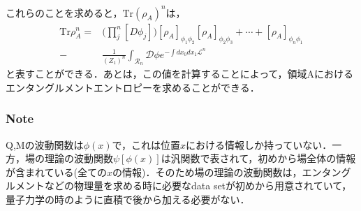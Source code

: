 これらのことを求めると，$\mathrm{Tr}(\rho_A)^n$は，
\begin{align}
  \mathrm{Tr}\rho_{A}^{n}=&\biggl(\prod^{n}_{j}[D\phi_{j}]\biggr)[\rho_{A}]_{\phi_1\phi_2}[\rho_{A}]_{\phi_2\phi_3}+\cdots+[\rho_{A}]_{\phi_n\phi_1}\\
  -&\frac{1}{(Z_1)^n}\int_{\mathcal{R}_n}\mathcal{D}\phi e^{-\int dx_0dx_1\mathcal{L}^{n}}
\end{align}
と表すことができる．あとは，この値を計算することによって，領域Aにおけるエンタングルメントエントロピーを求めることができる．

\newpage

\subsubsection{Note}

\hrulefill

Q,Mの波動関数は$\phi(x)$で，これは位置$x$における情報しか持っていない．一方，場の理論の波動関数$\psi[\phi(x)]$は汎関数で表されて，初めから場全体の情報が含まれている(全ての$x$の情報)．そのため場の理論の波動関数は，エンタングルメントなどの物理量を求める時に必要なdata setが初めから用意されていて，量子力学の時のように直積で後から加える必要がない．

\hrulefill

